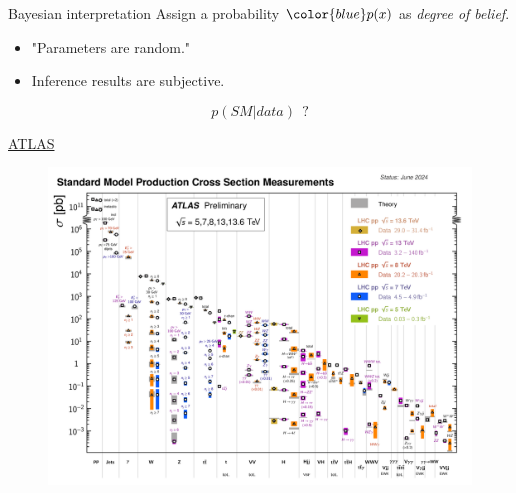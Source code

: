 \documentclass[
aspectratio=169,
14pt,
professionalfonts
]{beamer}
\begin{document}
\begin{frame}{Bayesian interpretation}
    Assign a probability $\color{blue} p(x)$ as \textit{degree of belief}.
    \begin{itemize}
        \item "Parameters are random."
        \item Inference results are subjective.
    \end{itemize}
    \begin{minipage}{0.49\textwidth}

        \large \color{blue}
        $$p(SM|data) ~~?$$
        
        \vspace{1cm}

        \small \flushright
        \href{https://atlas.web.cern.ch/Atlas/GROUPS/PHYSICS/PUBNOTES/ATL-PHYS-PUB-2024-011/fig_03a.png}{ATLAS}
    \end{minipage}
    \begin{minipage}{0.50\textwidth}
        \begin{figure}
            \centering
            \includegraphics[width=\textwidth]{../plots/sm_pred.png}
        \end{figure}
    \end{minipage}
\end{frame}
\end{document}
